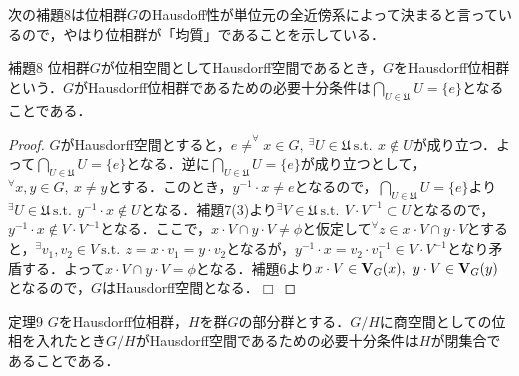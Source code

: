 \documentclass[a4paper,11pt]{jsarticle}
\newtheorem{proof}{証明}
\def\qed{\hfill $\Box$}
\newcommand{\st}{\mathrm{s.t.}\,}  %
\begin{document}
次の補題8は位相群$G$のHausdoff性が単位元の全近傍系によって決まると言っているので，やはり位相群が「均質」であることを示している．
%
%
%
\begin{itembox}[l]{補題8}
位相群$G$が位相空間としてHausdorff空間であるとき，$G$をHausdorff位相群という．$G$がHausdorff位相群であるための必要十分条件は$\displaystyle \underset{U\in\mathfrak{U}}{\bigcap}U=\{e\}$となることである．
\end{itembox}
\vspace{-0.7zh}%
\vspace{-0.7zh}%
\begin{proof}
$G$がHausdorff空間とすると，$e\neq ^\forall x\in G,{\ } ^\exists U\in\mathfrak{U}{\ }\st{\ }x\notin U$が成り立つ．よって$\underset{U\in\mathfrak{U}}{\bigcap}U=\{e\}$となる．逆に$\underset{U\in\mathfrak{U}}{\bigcap}U=\{e\}$が成り立つとして，$ ^\forall x,y\in G,{\ }x\neq y$とする．このとき，$y^{-1}\cdot x\neq e$となるので，$\underset{U\in\mathfrak{U}}{\bigcap}U=\{e\}$より$^\exists U\in\mathfrak{U}{\ }\st{\ }y^{-1}\cdot x\notin U$となる．補題7(3)より$^\exists V\in\mathfrak{U}{\ }\st{\ }V\cdot V^{-1}\subset U$となるので，$y^{-1}\cdot x\notin V\cdot V^{-1}$となる．ここで，$x\cdot V\cap y\cdot V\neq \phi$と仮定して$^\forall z\in x\cdot V\cap y\cdot V$とすると，$^\exists v_1,v_2\in V{\ }\st{\ }z=x\cdot v_1=y\cdot v_2$となるが，$y^{-1}\cdot x=v_2\cdot v_1^{-1}\in V\cdot V^{-1}$となり矛盾する．よって$x\cdot V\cap y\cdot V=\phi$となる．補題6より$x\cdot V\in{\bf V}_G(x),{\ }y\cdot V\in{\bf V}_G(y)$となるので，$G$はHausdorff空間となる．\qed
\end{proof}
%
%
%
\begin{itembox}[l]{定理9}
$G$をHausdorff位相群，$H$を群$G$の部分群とする．$G/H$に商空間としての位相を入れたとき$G/H$がHausdorff空間であるための必要十分条件は$H$が閉集合であることである．
\end{itembox}
\vspace{-0.7zh}%
\vspace{-0.7zh}%
\end{document}
